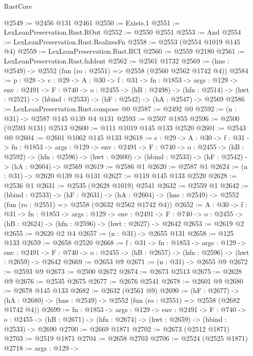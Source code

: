 \begin{lexlean}{RustCore}
\begin{coremodule}
@2549 := @2456 @131 @2461
@2550 := Exists.{1}
@2551 := LexLeanPreservation.Rust.ROut
@2552 := @2550 @2551
@2553 := And
@2554 := LexLeanPreservation.Rust.RealizesFn
@2558 := @2553 (@2554 @1019 @145 @4)
@2559 := LexLeanPreservation.Rust.RCI
@2560 := @2559 @2180
@2561 := LexLeanPreservation.Rust.fnIdent
@2562 := @2561 @1732
@2569 := (hne : @2549) -> @2552 (fun (ro : @2551) => @2558 (@2560 @2562 @1742 @4))
@2584 := {p : @28} ->
  {c : @29} ->
  {A : @30} ->
  {f : @31} ->
  {fn : @1853} ->
  {args : @129} ->
  {env : @2491} ->
  {F : @740} ->
  {o : @2455} ->
  (hB : @2498) ->
  (hfn : @2514) -> (hwt : @2521) -> (hbind : @2533) -> (hF : @2542) -> (hA : @2547) -> @2569
@2586 := LexLeanPreservation.Rust.compose @0
@2587 := @2492 @0
@2592 := (n : @31) -> @2587 @145 @139 @4 @131
@2593 := @2507 @1855
@2596 := @2500 (@2593 @131) @2513
@2600 := @111 @1019 @145 @133 @2520
@2601 := @2543 @0
@2604 := @2601 @1062 @145 @133
@2618 := {c : @29} ->
  {A : @30} ->
  {f : @31} ->
  {fn : @1853} ->
  {args : @129} ->
  {env : @2491} ->
  {F : @740} ->
  {o : @2455} ->
  (hB : @2592) ->
  (hfn : @2596) -> (hwt : @2600) -> (hbind : @2533) -> (hF : @2542) -> (hA : @2604) -> @2569
@2619 := @2586 @1
@2620 := @2587 @1
@2624 := (n : @31) -> @2620 @139 @4 @131
@2627 := @119 @145 @133 @2520
@2628 := @2536 @1
@2631 := @2535 (@2628 @1019) @2541
@2632 := @2559 @1
@2642 := (hbind : @2533) ->
  (hF : @2631) ->
  (hA : @2604) -> (hne : @2549) -> @2552 (fun (ro : @2551) => @2558 (@2632 @2562 @1742 @4))
@2652 := {A : @30} ->
  {f : @31} ->
  {fn : @1853} ->
  {args : @129} ->
  {env : @2491} ->
  {F : @740} -> {o : @2455} -> (hB : @2624) -> (hfn : @2596) -> (hwt : @2627) -> @2642
@2653 := @2619 @2
@2655 := @2620 @2 @4
@2657 := (n : @31) -> @2655 @131
@2658 := @125 @133
@2659 := @2658 @2520
@2668 := {f : @31} ->
  {fn : @1853} ->
  {args : @129} ->
  {env : @2491} ->
  {F : @740} -> {o : @2455} -> (hB : @2657) -> (hfn : @2596) -> (hwt : @2659) -> @2642
@2669 := @2653 @9
@2671 := (n : @31) -> @2655 @9
@2672 := @2593 @9
@2673 := @2500 @2672
@2674 := @2673 @2513
@2675 := @2628 @9
@2676 := @2535 @2675
@2677 := @2676 @2541
@2678 := @2601 @9
@2680 := @2678 @145 @133
@2682 := @2632 (@2561 @9)
@2690 := (hF : @2677) ->
  (hA : @2680) -> (hne : @2549) -> @2552 (fun (ro : @2551) => @2558 (@2682 @1742 @4))
@2699 := {fn : @1853} ->
  {args : @129} ->
  {env : @2491} ->
  {F : @740} ->
  {o : @2455} -> (hB : @2671) -> (hfn : @2674) -> (hwt : @2659) -> (hbind : @2533) -> @2690
@2700 := @2669 @1871
@2702 := @2673 (@2512 @1871)
@2703 := @2519 @1871
@2704 := @2658 @2703
@2706 := @2524 (@2525 @1871)
@2718 := {args : @129} ->

\end{coremodule}
\end{lexlean}
